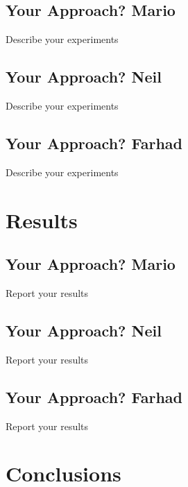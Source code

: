 \documentclass{article} %
\begin{document}
\subsection{Your Approach? Mario}
Describe your experiments

\subsection{Your Approach? Neil}
Describe your experiments

\subsection{Your Approach? Farhad}
Describe your experiments

\section{Results}

\subsection{Your Approach? Mario}
Report your results

\subsection{Your Approach? Neil}
Report your results

\subsection{Your Approach? Farhad}
Report your results

\section{Conclusions}





	
\end{document}
